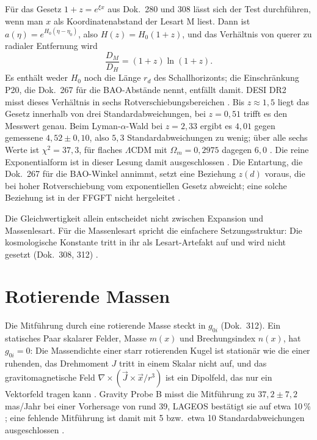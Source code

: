 Für das Gesetz $1+z=e^{\xi x}$ aus Dok.~280 und 308 lässt sich der Test durchführen, wenn man $x$ als
Koordinatenabstand der Lesart M liest. Dann ist $a(\eta)=e^{H_0(\eta-\eta_0)}$, also $H(z)=H_0(1+z)$,
und das Verhältnis von querer zu radialer Entfernung wird
\begin{equation}
\frac{D_M}{D_H}=(1+z)\ln(1+z).
\end{equation}
Es enthält weder $H_0$ noch die Länge $r_d$ des Schallhorizonts; die Einschränkung P20, die
Dok.~267 für die BAO-Abstände nennt, entfällt damit. DESI DR2~\cite{DESI2025} misst dieses Verhältnis
in sechs Rotverschiebungsbereichen \QM. Bis $z\approx1{,}5$ liegt das Gesetz innerhalb von drei
Standardabweichungen, bei $z=0{,}51$ trifft es den Messwert genau. Beim Lyman-$\alpha$-Wald bei
$z=2{,}33$ ergibt es $4{,}01$ gegen gemessene $4{,}52\pm0{,}10$, also $5{,}3$ Standardabweichungen zu
wenig; über alle sechs Werte ist $\chi^2=37{,}3$, für flaches $\Lambda$CDM mit $\Omega_m=0{,}2975$
dagegen $6{,}0$ \KM. Die reine Exponentialform ist in dieser Lesung damit ausgeschlossen \XM. Die
Entartung, die Dok.~267 für die BAO-Winkel annimmt, setzt eine Beziehung $z(d)$ voraus, die bei hoher
Rotverschiebung vom exponentiellen Gesetz abweicht; eine solche Beziehung ist in der FFGFT nicht
hergeleitet \SM.

Die Gleichwertigkeit allein entscheidet nicht zwischen Expansion und Massenlesart. Für die
Massenlesart spricht die einfachere Setzungsstruktur: Die kosmologische Konstante tritt in ihr als
Lesart-Artefakt auf und wird nicht gesetzt (Dok.~308, 312) \SM.

\section{Rotierende Massen}

Die Mitführung durch eine rotierende Masse steckt in $g_{0i}$ (Dok.~312). Ein statisches Paar
skalarer Felder, Masse $m(x)$ und Brechungsindex $n(x)$, hat $g_{0i}=0$: Die Massendichte einer starr
rotierenden Kugel ist stationär wie die einer ruhenden, das Drehmoment $J$ tritt in einem Skalar
nicht auf, und das gravitomagnetische Feld $\nabla\times(\vec J\times\vec x/r^3)$ ist ein Dipolfeld,
das nur ein Vektorfeld tragen kann \BM. Gravity Probe B misst die Mitführung zu
$37{,}2\pm7{,}2$\,mas/Jahr bei einer Vorhersage von rund 39, LAGEOS bestätigt sie auf etwa 10\,\%
\QM; eine fehlende Mitführung ist damit mit 5 bzw.\ etwa 10 Standardabweichungen ausgeschlossen
\KM.


